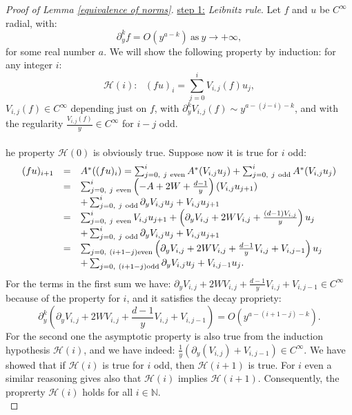 \documentclass[11pt,a4paper,reqno]{amsart}
\theoremstyle{remark}
\numberwithin{equation}{section}
\begin{document}
\begin{appendix}
\begin{proof}[Proof of Lemma \ref{equivalence of norms}]
\underline{step 1:} \emph{Leibnitz rule}. Let $f$ and $u$ be $C^{\infty}$ radial, with:
$$
\partial_y^k f =O\left( y^{a-k} \right) \ \text{as} \ y\rightarrow +\infty ,
$$
for some real number $a$. We will show the following property by induction: for any integer $i$:
$$
\mathcal{H}(i): \ \ \ (fu)_i=\sum_{j=0}^i V_{i,j}(f)u_j ,
$$
$V_{i,j}(f)\in C^{\infty} $ depending just on $f$, with $\partial_y^k V_{i,j}(f)\sim y^{a-(j-i)-k}$, and with the regularity $\frac{V_{i,j}(f)}{y}\in C^{\infty}$ for $i-j$ odd.\\
\\
he property $\mathcal{H}(0)$ is obviously true. Suppose now it is true for $i$ odd:
$$
\begin{array}{r c l}
(fu)_{i+1}&=&A^*((fu)_i)=\sum_{j=0, \ j \ \text{even}}^i A^*(V_{i,j}u_j)+\sum_{j=0, \ j \  \text{odd}}^iA^*(V_{i,j}u_j) \\
&=& \sum_{j=0, \ j \ \text{even}}^i \left( -A+2W+\frac{d-1}{y}\right) (V_{i,j}u_{j+1})\\ &&+\sum_{j=0, \ j \ \text{odd}}^i \partial_y V_{i,j}u_j+V_{i,j}u_{j+1} \\
&=& \sum_{j=0, \ j \ \text{even}}^i V_{i,j}u_{j+1}+\left( \partial_y V_{i,j} +2WV_{i,j}+\frac{(d-1)V_{i,j}}{y}   \right)u_j \\
&&+\sum_{j=0, \ j \ \text{odd}}^i \partial_y V_{i,j}u_j+V_{i,j}u_{j+1} \\
&=& \sum_{j=0, \ (i+1-j) \text{even}} \left(\partial_y V_{i,j}+2W V_{i,j}+\frac{d-1}{y}V_{i,j}+V_{i,j-1}\right) u_j \\
&& +\sum_{j=0, \ (i+1-j) \text{odd}} \partial_y V_{i,j}u_j +V_{i,j-1}u_j .
\end{array}
$$
For the terms in the first sum we have: $\partial_y V_{i,j}+2W V_{i,j}+\frac{d-1}{y}V_{i,j}+V_{i,j-1}\in C^{\infty}$ because of the property for $i$, and it satisfies the decay propriety:
$$
\partial_y^k\left(\partial_y V_{i,j}+2W V_{i,j}+\frac{d-1}{y}V_{i,j}+V_{i,j-1}\right)=O\left( y^{a-(i+1-j)-k} \right) .
$$
For the second one the asymptotic property is also true from the induction hypothesis $\mathcal{H}(i)$, and we have indeed: $\frac{1}{y}(\partial_y(V_{i,j})+V_{i,j-1})\in C^{\infty}$. We have showed that if $\mathcal{H}(i)$ is true for $i$ odd, then $\mathcal{H}(i+1)$ is true. For $i$ even a similar reasoning gives also that $\mathcal{H}(i)$ implies $\mathcal{H}(i+1)$. Consequently, the proprerty $\mathcal{H}(i)$ holds for all $i\in \mathbb{N}$.\\

\end{proof}
\end{appendix}
\end{document}
